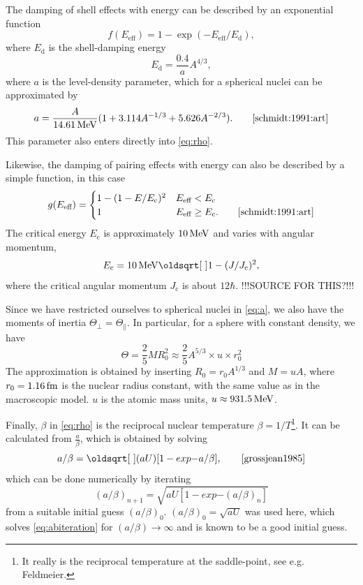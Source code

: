 The damping of shell effects with energy can be described by an exponential function
\begin{equation}
f(E_\text{eff}) = 1-\exp{\left(-E_\text{eff}/E_\text{d}\right)},
\end{equation}
where $E_\text{d}$ is the shell-damping energy 
\begin{equation}
E_\text{d} = \frac{0.4}{a} A^{4/3},
\end{equation}
where $a$ is the level-density parameter, which for a spherical nuclei can be approximated by
\begin{equation}
a=\frac{A}{\unit[14.61]{MeV}}(1+3.114 A^{-1/3} + 5.626 A^{-2/3}).\qquad\cite{schmidt:1991:art}\label{eq:a}
\end{equation}
This parameter also enters directly into \eqref{eq:rho}.

Likewise, the damping of pairing effects with energy can also be described by a simple function, in this case
\begin{equation}
g(E_\text{eff}) = \begin{cases} 1-(1-E/E_\text{c})^2 & E_\text{eff} < E_\text{c} \\
 1 & E_\text{eff} \ge E_\text{c}.\qquad\cite{schmidt:1991:art}
\end{cases}
\end{equation}
The critical energy $E_\text{c}$ is approximately $\unit[10]{MeV}$ and varies with angular momentum, 
\begin{equation}
E_\text{c} = \unit[10]{MeV}\sqrt{1-(J/J_\text{c})^2},
\end{equation}
where the critical angular momentum $J_\text{c}$ is about $12\hbar$. !!!SOURCE FOR THIS?!!!

Since we have restricted ourselves to spherical nuclei in \eqref{eq:a}, we also have the moments of inertia $\Theta_\perp = \Theta_\parallel$. In particular, for a sphere with constant density, we have
\begin{equation}
\Theta = \frac{2}{5} M R_0^2 \approx \frac{2}{5} A^{5/3}\times u \times r_0^2
\end{equation}
The approximation is obtained by inserting $R_0 = r_0 A^{1/3}$ and $M=u A$, where $r_0=\unit[1.16]{fm}$ is the nuclear radius constant, with the same value as in the macroscopic model\cite{moller1995}. $u$ is the atomic mass units, $u \approx \unit[931.5]{MeV}$.

Finally, $\beta$ in \eqref{eq:rho} is the reciprocal nuclear temperature $\beta=1/T$\footnote{It really is the reciprocal temperature at the saddle-point, see e.g. Feldmeier\cite{grossjean1985}.}. It can be calculated from $\tfrac{a}{\beta}$, which is obtained by solving
\begin{equation}
a/\beta=\sqrt{(aU)[1 -exp{-a/\beta}]},\qquad\cite{grossjean1985}\label{eq:abiteration}
\end{equation}
which can be done numerically by iterating
\begin{equation}
(a/\beta)_{n+1}=\sqrt{aU[1 -exp{-(a/\beta)_n}]}
\end{equation}
from a suitable initial guess $(a/\beta)_{0}$. $(a/\beta)_{0}=\sqrt{aU}$ was used here, which solves \eqref{eq:abiteration} for $(a/\beta) \to \infty$ and is known to be a good initial guess\cite{grossjean1985}.

